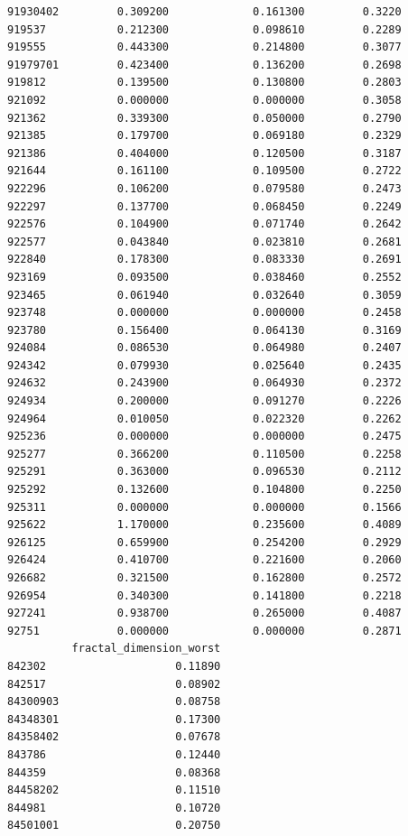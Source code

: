 \documentclass[
  letterpaper,
  DIV=11,
  numbers=noendperiod]{scrartcl}
\begin{document}
\begin{verbatim}
91930402         0.309200             0.161300         0.3220
919537           0.212300             0.098610         0.2289
919555           0.443300             0.214800         0.3077
91979701         0.423400             0.136200         0.2698
919812           0.139500             0.130800         0.2803
921092           0.000000             0.000000         0.3058
921362           0.339300             0.050000         0.2790
921385           0.179700             0.069180         0.2329
921386           0.404000             0.120500         0.3187
921644           0.161100             0.109500         0.2722
922296           0.106200             0.079580         0.2473
922297           0.137700             0.068450         0.2249
922576           0.104900             0.071740         0.2642
922577           0.043840             0.023810         0.2681
922840           0.178300             0.083330         0.2691
923169           0.093500             0.038460         0.2552
923465           0.061940             0.032640         0.3059
923748           0.000000             0.000000         0.2458
923780           0.156400             0.064130         0.3169
924084           0.086530             0.064980         0.2407
924342           0.079930             0.025640         0.2435
924632           0.243900             0.064930         0.2372
924934           0.200000             0.091270         0.2226
924964           0.010050             0.022320         0.2262
925236           0.000000             0.000000         0.2475
925277           0.366200             0.110500         0.2258
925291           0.363000             0.096530         0.2112
925292           0.132600             0.104800         0.2250
925311           0.000000             0.000000         0.1566
925622           1.170000             0.235600         0.4089
926125           0.659900             0.254200         0.2929
926424           0.410700             0.221600         0.2060
926682           0.321500             0.162800         0.2572
926954           0.340300             0.141800         0.2218
927241           0.938700             0.265000         0.4087
92751            0.000000             0.000000         0.2871
          fractal_dimension_worst
842302                    0.11890
842517                    0.08902
84300903                  0.08758
84348301                  0.17300
84358402                  0.07678
843786                    0.12440
844359                    0.08368
84458202                  0.11510
844981                    0.10720
84501001                  0.20750

\end{verbatim}
\end{document}
